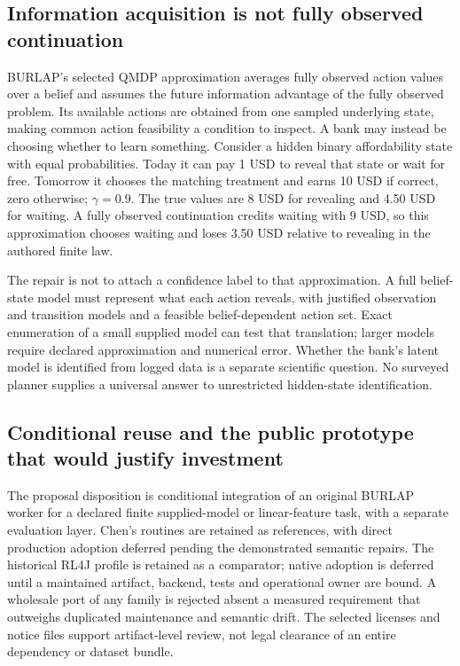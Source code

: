 \subsection{Information acquisition is not fully observed continuation}
BURLAP's selected QMDP approximation averages fully observed action values over a belief and assumes the future information advantage of the fully observed problem. Its available actions are obtained from one sampled underlying state, making common action feasibility a condition to inspect. A bank may instead be choosing whether to learn something. Consider a hidden binary affordability state with equal probabilities. Today it can pay 1 USD to reveal that state or wait for free. Tomorrow it chooses the matching treatment and earns 10 USD if correct, zero otherwise; $\gamma=0.9$. The true values are 8 USD for revealing and 4.50 USD for waiting. A fully observed continuation credits waiting with 9 USD, so this approximation chooses waiting and loses 3.50 USD relative to revealing in the authored finite law.~\citep{exec24_policyjava_burlap,exec24_policyjava_comparison}

The repair is not to attach a confidence label to that approximation. A full belief-state model must represent what each action reveals, with justified observation and transition models and a feasible belief-dependent action set. Exact enumeration of a small supplied model can test that translation; larger models require declared approximation and numerical error. Whether the bank's latent model is identified from logged data is a separate scientific question. No surveyed planner supplies a universal answer to unrestricted hidden-state identification.

\subsection{Conditional reuse and the public prototype that would justify investment}
The proposal disposition is conditional integration of an original BURLAP worker for a declared finite supplied-model or linear-feature task, with a separate evaluation layer. Chen's routines are retained as references, with direct production adoption deferred pending the demonstrated semantic repairs. The historical RL4J profile is retained as a comparator; native adoption is deferred until a maintained artifact, backend, tests and operational owner are bound. A wholesale port of any family is rejected absent a measured requirement that outweighs duplicated maintenance and semantic drift. The selected licenses and notice files support artifact-level review, not legal clearance of an entire dependency or dataset bundle.~\citep{exec24_policyjava_comparison}

